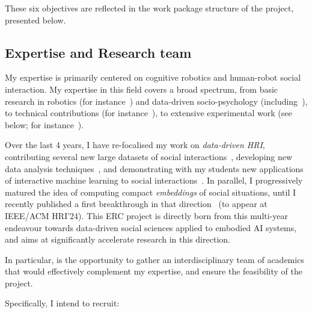 These six objectives are reflected in the work package structure of the project,
presented below.




\subsection{Expertise and Research team}
\label{research-team}

My expertise is primarily centered on cognitive robotics and human-robot social
interaction. My expertise in this field covers a broad spectrum, from basic
research in robotics (for
instance~\cite{lemaignan2014dynamics,lemaignan2015mutual}) and data-driven
socio-psychology
(including~\cite{lemaignan2014cognitive,irfan2018social,winkle2019effective,bartlett2019what}),
to technical contributions (for instance~\cite{lemaignan2010oro,
lemaignan2017artificial, lemaignan2018underworlds}), to extensive experimental
work (see below; for instance~\cite{hood2015cowriter,winkle2020couch,
lemaignan2022social}).

Over the last 4 years, I have re-focalised my work on \emph{data-driven HRI},
contributing several new large datasets of social
interactions~\cite{lemaignan2018pinsoro,sallami2020unexpected,webb2023sogrin},
developing new data analysis
techniques~\cite{bartlett2019what,webb2022measuring}, and demonstrating with my
students new applications of interactive machine learning to social
interactions~\cite{senft2016sparc,winkle2020couch,winkle2021leador}.  In
parallel, I progressively matured the idea of computing compact
\emph{embeddings} of social situations, until I recently published a first
breakthrough in that direction~\cite{lemaignan2024social} (to appear at IEEE/ACM
HRI'24). This ERC project is directly born from this multi-year endeavour
towards data-driven social sciences applied to embodied AI systems, and aims at
significantly accelerate research in this direction.

In particular, \project is the opportunity to gather an interdisciplinary team
of academics that would effectively complement my expertise, and ensure the
feasibility of the project.

Specifically, I intend to recruit:

